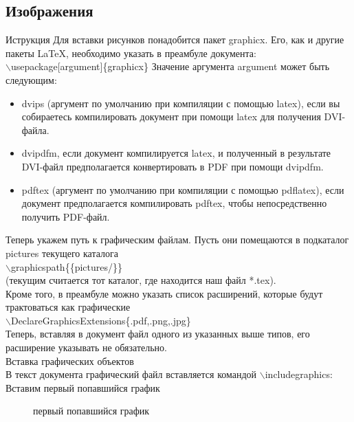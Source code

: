 \documentclass[a4paper,14pt,oneside]{book}
\theoremstyle{plain} %
\theoremstyle{definition} %
\theoremstyle{remark} %
\begin{document}
\subsection{Изображения}
Иструкция
Для вставки рисунков понадобится пакет graphicx. Его, как и другие пакеты LaTeX, необходимо указать в преамбуле документа:\\
$\backslash$usepackage[argument]\{graphicx\}
Значение аргумента argument может быть следующим:
\begin{itemize}
\item dvips (аргумент по умолчанию при компиляции с помощью latex), если вы собираетесь компилировать документ при помощи latex для получения DVI-файла.
\item dvipdfm, если документ компилируется latex, и полученный в результате DVI-файл предполагается конвертировать в PDF при помощи dvipdfm.
\item pdftex (аргумент по умолчанию при компиляции с помощью pdflatex), если документ предполагается компилировать pdftex, чтобы непосредственно получить PDF-файл.
\end{itemize}
Теперь укажем путь к графическим файлам. Пусть они помещаются в подкаталог pictures текущего каталога \\
$\backslash$graphicspath\{\{pictures/\}\}\\
(текущим считается тот каталог, где находится наш файл *.tex).\\
Кроме того, в преамбуле можно указать список расширений, которые будут трактоваться как графические\\
$\backslash$DeclareGraphicsExtensions\{.pdf,.png,.jpg\}\\
Теперь, вставляя в документ файл одного из указанных выше типов, его расширение указывать не обязательно.\\
Вставка графических объектов\\
В текст документа графический файл вставляется командой $\backslash$includegraphics:\\
Вставим первый попавшийся график\\
\begin{figure}[h]
\caption{первый попавшийся график}
\label{fig:1}
\end{figure}
\end{document}
